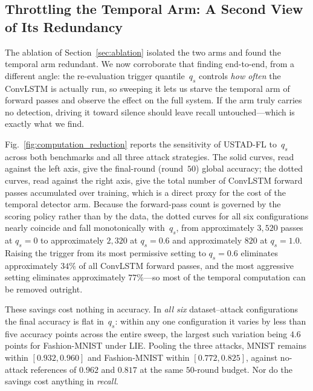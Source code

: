 \documentclass[journal]{IEEEtran}
\begin{document}
\subsection{Throttling the Temporal Arm: A Second View of Its Redundancy}
\label{sec:quantile_sweep}

The ablation of Section~\ref{sec:ablation} isolated the two arms and found the temporal arm redundant. We now corroborate that finding end-to-end, from a different angle: the re-evaluation trigger quantile~$q_s$ controls \emph{how often} the ConvLSTM is actually run, so sweeping it lets us starve the temporal arm of forward passes and observe the effect on the full system. If the arm truly carries no detection, driving it toward silence should leave recall untouched---which is exactly what we find.

Fig.~\ref{fig:computation_reduction} reports the sensitivity of USTAD-FL to~$q_s$ across both benchmarks and all three attack strategies. The solid curves, read against the left axis, give the final-round (round~$50$) global accuracy; the dotted curves, read against the right axis, give the total number of ConvLSTM forward passes accumulated over training, which is a direct proxy for the cost of the temporal detector arm. Because the forward-pass count is governed by the scoring policy rather than by the data, the dotted curves for all six configurations nearly coincide and fall monotonically with~$q_s$, from approximately $3{,}520$ passes at $q_s = 0$ to approximately $2{,}320$ at $q_s = 0.6$ and approximately $820$ at $q_s = 1.0$. Raising the trigger from its most permissive setting to $q_s = 0.6$ eliminates approximately $34\%$ of all ConvLSTM forward passes, and the most aggressive setting eliminates approximately $77\%$---so most of the temporal computation can be removed outright.

These savings cost nothing in accuracy. In \emph{all six} dataset--attack configurations the final accuracy is flat in~$q_s$: within any one configuration it varies by less than five accuracy points across the entire sweep, the largest such variation being $4.6$ points for Fashion-MNIST under LIE. Pooling the three attacks, MNIST remains within $[0.932, 0.960]$ and Fashion-MNIST within $[0.772, 0.825]$, against no-attack references of $0.962$ and $0.817$ at the same $50$-round budget. Nor do the savings cost anything in \emph{recall}.
\end{document}
